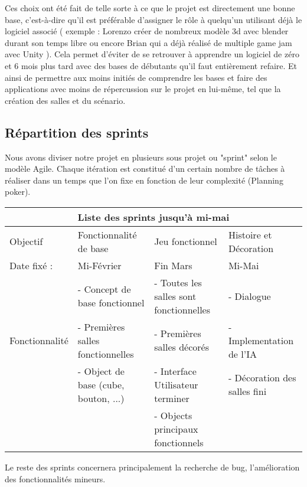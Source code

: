 \documentclass[a4paper,11pt]{article}
\begin{document}
Ces choix ont été fait de telle sorte à ce que le projet est directement une bonne base, 
c’est-à-dire qu’il est préférable d’assigner le rôle à quelqu'un utilisant déjà le logiciel 
associé ( exemple : Lorenzo créer de nombreux modèle 3d avec blender durant son temps libre ou encore
 Brian qui a déjà réalisé de multiple game jam avec Unity ). Cela permet d'éviter de se retrouver à 
 apprendre un logiciel de zéro et 6 mois plus tard avec des bases de débutants qu’il faut entièrement refaire.
Et ainsi de permettre aux moins initiés de comprendre les bases et faire des applications avec 
moins de répercussion sur le projet en lui-même, tel que la création des salles et du scénario.

\subsection{Répartition des sprints}

Nous avons diviser notre projet en plusieurs sous projet ou "sprint" selon le modèle Agile.
Chaque itération est constitué d'un certain nombre de tâches à réaliser dans un temps que l'on fixe 
en fonction de leur complexité (Planning poker).\newline



\begin{tabular}{ |p{3cm}||p{3cm}|p{3cm}|p{3cm}|  }
 \hline
 \multicolumn{4}{|c|}{Liste des sprints jusqu'à mi-mai} \\
 \hline
 Objectif& Fonctionnalité de base  & Jeu fonctionnel & Histoire et Décoration\\
 \hline
 \hline
 Date fixé : & Mi-Février & Fin Mars & Mi-Mai\\
 \hline
 \multirow{3}{4em}{Fonctionnalité} & - Concept de base fonctionnel & - Toutes les salles sont fonctionnelles & - Dialogue\\ 
 & - Premières salles fonctionnelles & - Premières salles décorés & - Implementation de l'IA\\ 
 & - Object de base (cube, bouton, ...) & - Interface Utilisateur terminer & - Décoration des salles fini\\ 
 & & - Objects principaux fonctionnels & \\

 \hline
\end{tabular}


Le reste des sprints concernera principalement la recherche de bug, l'amélioration des 
fonctionnalités mineurs.
\end{document}
